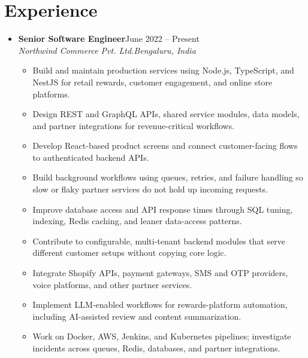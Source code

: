 \documentclass[letterpaper,10pt]{article}
\newcommand{\itemx}[1]{\item\small{#1\vspace{-2pt}}}
\newcommand{\subheading}[4]{\item \textbf{#1}\hfill #2\\\textit{\small #3}\hfill\textit{\small #4}\vspace{-5pt}}
\begin{document}
\section{Experience}
\begin{itemize}[leftmargin=.15in,label={}]
\subheading{Senior Software Engineer}{June 2022 -- Present}{Northwind Commerce Pvt. Ltd.}{Bengaluru, India}
\begin{itemize}[leftmargin=.18in]
\itemx{Build and maintain production services using Node.js, TypeScript, and NestJS for retail rewards, customer engagement, and online store platforms.}
\itemx{Design REST and GraphQL APIs, shared service modules, data models, and partner integrations for revenue-critical workflows.}
\itemx{Develop React-based product screens and connect customer-facing flows to authenticated backend APIs.}
\itemx{Build background workflows using queues, retries, and failure handling so slow or flaky partner services do not hold up incoming requests.}
\itemx{Improve database access and API response times through SQL tuning, indexing, Redis caching, and leaner data-access patterns.}
\itemx{Contribute to configurable, multi-tenant backend modules that serve different customer setups without copying core logic.}
\itemx{Integrate Shopify APIs, payment gateways, SMS and OTP providers, voice platforms, and other partner services.}
\itemx{Implement LLM-enabled workflows for rewards-platform automation, including AI-assisted review and content summarization.}
\itemx{Work on Docker, AWS, Jenkins, and Kubernetes pipelines; investigate incidents across queues, Redis, databases, and partner integrations.}
\end{itemize}
\end{itemize}
\end{document}
